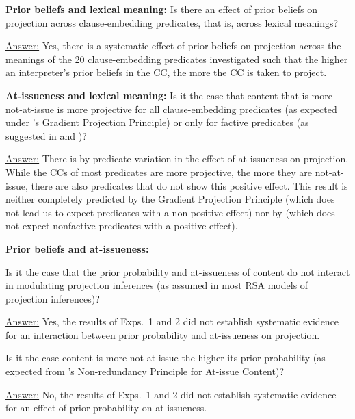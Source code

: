 \documentclass[11pt,fleqn]{article}
\newcommand{\6}{\mbox{$[\hspace*{-.6mm}[$}}
\newcommand{\9}{\mbox{$]\hspace*{-.6mm}]$}}
\newcommand{\citepos}[1]{\citeauthor{#1}'s \citeyear{#1}}
\begin{document}
\begin{exe}
 {\bf Prior beliefs and lexical meaning:} Is there an effect of prior beliefs on projection across clause-embedding predicates, that is, across lexical meanings? 

\underline{Answer:} Yes, there is a systematic effect of prior beliefs on projection across the meanings of the 20 clause-embedding predicates investigated such that the higher an interpreter's prior beliefs in the CC, the more the CC is taken to project.

 {\bf At-issueness and lexical meaning:} Is it the case that content that is more not-at-issue is more projective for all clause-embedding predicates (as expected under \citepos{tbd-variability} Gradient Projection Principle) or only for factive predicates (as suggested in \citealt{djaerv-bacovcin-salt27,djaerv-bacovcin2020} and \citealt{mahler-etal2020})? 

\underline{Answer:} There is by-predicate variation in the effect of at-issueness on projection. While the CCs of most predicates are more projective, the more they are not-at-issue, there are also predicates that do not show this positive effect. This result is neither completely predicted by the Gradient Projection Principle (which does not lead us to expect predicates with a non-positive effect) nor by \citealt{djaerv-bacovcin2020} (which does not expect nonfactive predicates with a positive effect).

 {\bf Prior beliefs and at-issueness:} 
\begin{xlist}
 Is it the case that the prior probability and at-issueness of content do not interact in modulating projection inferences  (as assumed in most RSA models of projection inferences)? 

\underline{Answer:} Yes, the results of Exps.~1 and 2 did not establish systematic evidence for an interaction between prior probability and at-issueness on projection.

 Is it the case content is more not-at-issue the higher its prior probability (as expected from \citepos{tonhauser-etal-eval} Non-redundancy Principle for At-issue Content)? 

\underline{Answer:} No, the results of Exps.~1 and 2 did not establish systematic evidence for an effect of prior probability on at-issueness. 

\end{xlist}
\end{exe}
\end{document}
